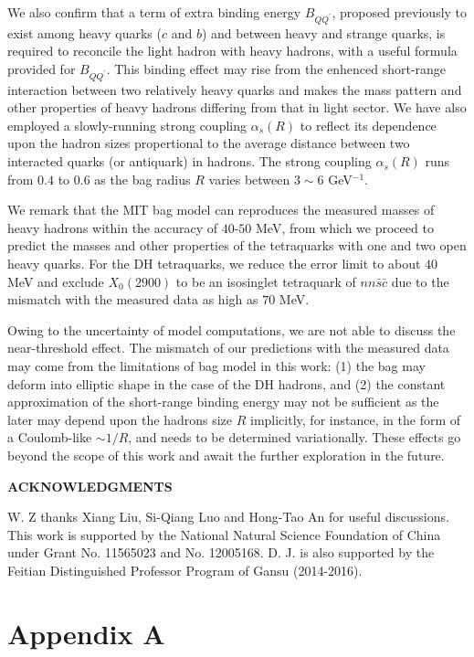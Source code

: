 \documentclass[prd,twocolumn,floatfix,nofootinbib]{revtex4}
\begin{document}
We also confirm that a term of extra binding energy $B_{QQ^{\prime }}$,
proposed previously to exist among heavy quarks ($c$ and $b$) and between
heavy and strange quarks\cite{KR:2014gca}, is required to reconcile the
light hadron with heavy hadrons, with a useful formula provided for $%
B_{QQ^{\prime }}$. This binding effect may rise from the enhenced
short-range interaction between two relatively heavy quarks and makes the
mass pattern and other properties of heavy hadrons differing from that in
light sector. We have also employed a slowly-running strong coupling $\alpha
_{s}(R)$ to reflect its dependence upon the hadron sizes propertional to the
average distance between two interacted quarks (or antiquark) in hadrons.
The strong coupling $\alpha _{s}(R)$ runs from $0.4$ to $0.6$ as the bag
radius $R$ varies between $3\sim 6$ GeV$^{-1}$.

We remark that the MIT bag model can reproduces the measured masses of heavy
hadrons within the accuracy of $40$-$50$ MeV, from which we proceed to
predict the masses and other properties of the tetraquarks with one and two
open heavy quarks. For the DH tetraquarks, we reduce the error limit to
about $40$ MeV and exclude $X_{0}(2900)$ to be an isosinglet tetraquark of $%
nn\bar{s}\bar{c}$ due to the mismatch with the measured data as high as $70$
MeV.

Owing to the uncertainty of model computations, we are not able to discuss
the near-threshold effect. The mismatch of our predictions with the measured
data may come from the limitations of bag model in this work: (1) the bag
may deform into elliptic shape in the case of the DH hadrons, and (2) the
constant approximation of the short-range binding energy may not be
sufficient as the later may depend upon the hadrons size $R$ implicitly, for
instance, in the form of a Coulomb-like $\sim 1/R$, and needs to be
determined variationally. These effects go beyond the scope of this work and
await the further exploration in the future.

\medskip \textbf{ACKNOWLEDGMENTS}

W. Z thanks Xiang Liu, Si-Qiang Luo and Hong-Tao An for useful discussions.
This work is supported by the National Natural Science Foundation of China
under Grant No. 11565023 and No. 12005168. D. J. is also supported by the
Feitian Distinguished Professor Program of Gansu (2014-2016).

\medskip

\section*{Appendix A}
\end{document}
